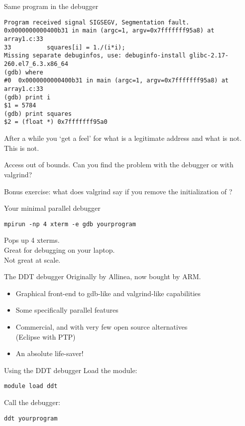 \documentclass[11pt,headernav]{beamer}
\begin{document}
\begin{frame}[containsverbatim]{Same program in the debugger}
  \small
\begin{verbatim}
Program received signal SIGSEGV, Segmentation fault.
0x0000000000400b31 in main (argc=1, argv=0x7fffffff95a8) at array1.c:33
33          squares[i] = 1./(i*i);
Missing separate debuginfos, use: debuginfo-install glibc-2.17-260.el7_6.3.x86_64
(gdb) where
#0  0x0000000000400b31 in main (argc=1, argv=0x7fffffff95a8) at array1.c:33
(gdb) print i
$1 = 5784
(gdb) print squares
$2 = (float *) 0x7fffffff95a0
\end{verbatim}
After a while you `get a feel' for what is a legitimate address
and what is not. This is not.
\end{frame}

\begin{exerciseframe}[array2]
  Access out of bounds.
  Can you find the problem with the debugger or with valgrind?

  Bonus exercise: what does valgrind say if you remove the 
  initialization of ?
\end{exerciseframe}


\begin{frame}[containsverbatim]{Your minimal parallel debugger}
\begin{verbatim}
mpirun -np 4 xterm -e gdb yourprogram
\end{verbatim}
Pops up 4 xterms.\\
Great for debugging on your laptop.\\
Not great at scale.
\end{frame}

\begin{frame}{The DDT debugger}
  Originally by Allinea, now bought by ARM.
  \begin{itemize}
  \item Graphical front-end to gdb-like and valgrind-like capabilities
  \item Some specifically parallel features
  \item Commercial, and with very few open source alternatives\\
    (Eclipse with PTP)
  \item An absolute life-saver!
  \end{itemize}
\end{frame}

\begin{frame}[containsverbatim]{Using the DDT debugger}
  Load the module:
\begin{verbatim}
module load ddt
\end{verbatim}
Call the debugger:
\begin{verbatim}
ddt yourprogram
\end{verbatim}

\end{frame}
\end{document}
